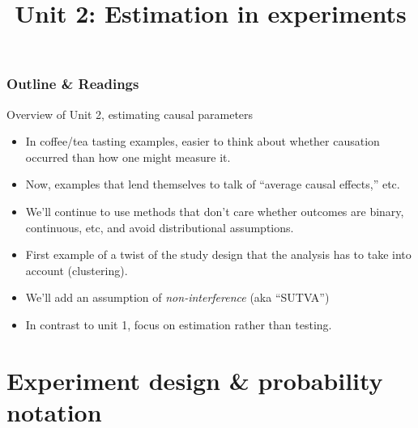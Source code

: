 %

%

%





\title{Unit 2: Estimation in experiments}




  \begin{frame}
    \frametitle{Outline \& Readings}

\tableofcontents[subsectionstyle=show/hide/hide]

\end{frame}






\begin{frame}{Overview of Unit 2, estimating causal parameters}
  \begin{itemize}
  \item In coffee/tea tasting examples, easier to think about whether causation occurred than how one might measure it.
  \item Now, examples that lend themselves to talk of ``average causal effects,'' etc.
  \item We'll continue to use methods that don't care whether outcomes
    are binary, continuous, etc, and avoid distributional assumptions.
  \item  First example of a  twist of the study design that the
    analysis has to take into account (clustering).   
  \item We'll add an assumption of \textit{non-interference} (aka ``SUTVA'')
  \item In contrast to unit 1, focus on estimation rather than testing.
  \end{itemize}
\end{frame}


\section{Experiment design \& probability notation} 


